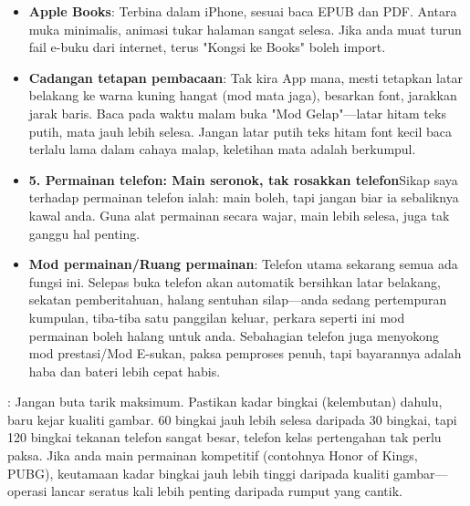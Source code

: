 \begin{itemize}
  \item \textbf{Apple Books}: Terbina dalam iPhone, sesuai baca EPUB dan PDF. Antara muka minimalis, animasi tukar halaman sangat selesa. Jika anda muat turun fail e-buku dari internet, terus "Kongsi ke Books" boleh import.
  \item \textbf{Cadangan tetapan pembacaan}: Tak kira App mana, mesti tetapkan latar belakang ke warna kuning hangat (mod mata jaga), besarkan font, jarakkan jarak baris. Baca pada waktu malam buka "Mod Gelap"—latar hitam teks putih, mata jauh lebih selesa. Jangan latar putih teks hitam font kecil baca terlalu lama dalam cahaya malap, keletihan mata adalah berkumpul.
  \item \textbf{5. Permainan telefon: Main seronok, tak rosakkan telefon}Sikap saya terhadap permainan telefon ialah: main boleh, tapi jangan biar ia sebaliknya kawal anda. Guna alat permainan secara wajar, main lebih selesa, juga tak ganggu hal penting.
  \item \textbf{Mod permainan/Ruang permainan}: Telefon utama sekarang semua ada fungsi ini. Selepas buka telefon akan automatik bersihkan latar belakang, sekatan pemberitahuan, halang sentuhan silap—anda sedang pertempuran kumpulan, tiba-tiba satu panggilan keluar, perkara seperti ini mod permainan boleh halang untuk anda. Sebahagian telefon juga menyokong mod prestasi/Mod E-sukan, paksa pemproses penuh, tapi bayarannya adalah haba dan bateri lebih cepat habis.
\end{itemize}


: Jangan buta tarik maksimum. Pastikan kadar bingkai (kelembutan) dahulu, baru kejar kualiti gambar. 60 bingkai jauh lebih selesa daripada 30 bingkai, tapi 120 bingkai tekanan telefon sangat besar, telefon kelas pertengahan tak perlu paksa. Jika anda main permainan kompetitif (contohnya Honor of Kings, PUBG), keutamaan kadar bingkai jauh lebih tinggi daripada kualiti gambar—operasi lancar seratus kali lebih penting daripada rumput yang cantik.


